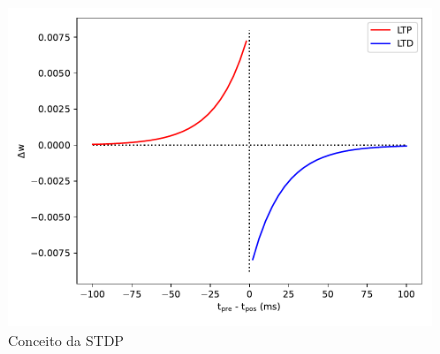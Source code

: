 \begin{figure}[h!]
	\centering
	\caption{Conceito da STDP}
	\label{fig:stdp}
	\includegraphics[width=0.7\linewidth]{figs/stdp}
\end{figure}



